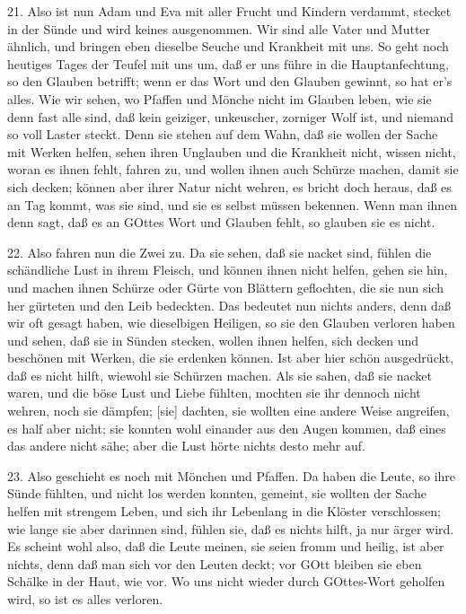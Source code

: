 21. Also ist nun Adam und Eva mit aller Frucht und Kindern verdammt, stecket in der Sünde und wird keines ausgenommen. Wir sind alle Vater und Mutter ähnlich, und bringen eben dieselbe Seuche und Krankheit mit uns. So geht noch heutiges Tages der Teufel mit uns um, daß er uns führe in die Hauptanfechtung, so den Glauben betrifft; wenn er das Wort und den Glauben gewinnt, so hat er’s alles. Wie wir sehen, wo Pfaffen und Mönche nicht im Glauben leben, wie sie denn fast alle sind, daß kein geiziger, unkeuscher, zorniger Wolf ist, und niemand so voll Laster steckt. Denn sie stehen auf dem Wahn, daß sie wollen der Sache mit Werken helfen, sehen ihren Unglauben und die Krankheit nicht, wissen nicht, woran es ihnen fehlt, fahren zu, und wollen ihnen auch Schürze machen, damit sie sich decken; können aber ihrer Natur nicht wehren, es bricht doch heraus, daß es an Tag kommt, was sie sind, und sie es selbst müssen bekennen. Wenn man ihnen denn sagt, daß es an GOttes Wort und Glauben fehlt, so glauben sie es nicht.

22. Also fahren nun die Zwei zu. Da sie sehen, daß sie nacket sind, fühlen die schändliche Lust in ihrem Fleisch, und können ihnen nicht helfen, gehen sie hin, und machen ihnen Schürze oder Gürte von Blättern geflochten, die sie nun sich her gürteten und den Leib bedeckten. Das bedeutet nun nichts anders, denn daß wir oft gesagt haben, wie dieselbigen Heiligen, so sie den Glauben verloren haben und sehen, daß sie in Sünden stecken, wollen ihnen helfen, sich decken und beschönen mit Werken, die sie erdenken können. Ist aber hier schön ausgedrückt, daß es nicht hilft, wiewohl sie Schürzen machen. Als sie sahen, daß sie nacket waren, und die böse Lust und Liebe fühlten, mochten sie ihr dennoch nicht wehren, noch sie dämpfen; [sie] dachten, sie wollten eine andere Weise angreifen, es half aber nicht; sie konnten wohl einander aus den Augen kommen, daß eines das andere nicht sähe; aber die Lust hörte nichts desto mehr auf.

23. Also geschieht es noch mit Mönchen und Pfaffen. Da haben die Leute, so ihre Sünde fühlten, und nicht los werden konnten, gemeint, sie wollten der Sache helfen mit strengem Leben, und sich ihr Lebenlang in die Klöster verschlossen; wie lange sie aber darinnen sind, fühlen sie, daß es nichts hilft, ja nur ärger wird. Es scheint wohl also, daß die Leute meinen, sie seien fromm und heilig, ist aber nichts, denn daß man sich vor den Leuten deckt; vor GOtt bleiben sie eben Schälke in der Haut, wie vor. Wo uns nicht wieder durch GOttes-Wort geholfen wird, so ist es alles verloren.

